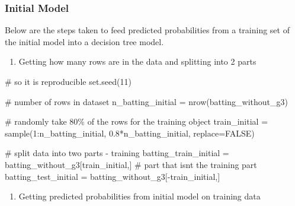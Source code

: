 \documentclass[
  letterpaper,
  DIV=11,
  numbers=noendperiod]{scrartcl}
\newenvironment{Shaded}{\begin{snugshade}}{\end{snugshade}}
\newcommand{\AttributeTok}[1]{\textcolor[rgb]{0.40,0.45,0.13}{#1}}
\newcommand{\CommentTok}[1]{\textcolor[rgb]{0.37,0.37,0.37}{#1}}
\newcommand{\ConstantTok}[1]{\textcolor[rgb]{0.56,0.35,0.01}{#1}}
\newcommand{\DecValTok}[1]{\textcolor[rgb]{0.68,0.00,0.00}{#1}}
\newcommand{\FloatTok}[1]{\textcolor[rgb]{0.68,0.00,0.00}{#1}}
\newcommand{\FunctionTok}[1]{\textcolor[rgb]{0.28,0.35,0.67}{#1}}
\newcommand{\NormalTok}[1]{\textcolor[rgb]{0.00,0.23,0.31}{#1}}
\newcommand{\OtherTok}[1]{\textcolor[rgb]{0.00,0.23,0.31}{#1}}
\newcommand{\SpecialCharTok}[1]{\textcolor[rgb]{0.37,0.37,0.37}{#1}}
\providecommand{\tightlist}{%
  \setlength{\itemsep}{0pt}\setlength{\parskip}{0pt}}\usepackage{longtable,booktabs,array}
\begin{document}
\subsubsection{Initial Model}\label{initial-model-1}

Below are the steps taken to feed predicted probabilities from a
training set of the initial model into a decision tree model.

\begin{enumerate}
\def\labelenumi{\arabic{enumi}.}
\tightlist
\item
  Getting how many rows are in the data and splitting into 2 parts
\end{enumerate}

\begin{Shaded}
\begin{Highlighting}[]
\CommentTok{\# so it is reproducible}
\FunctionTok{set.seed}\NormalTok{(}\DecValTok{11}\NormalTok{)}

\CommentTok{\# number of rows in dataset }
\NormalTok{n\_batting\_initial }\OtherTok{=} \FunctionTok{nrow}\NormalTok{(batting\_without\_g3)}

\CommentTok{\# randomly take 80\% of the rows for the training object }
\NormalTok{train\_initial }\OtherTok{=} \FunctionTok{sample}\NormalTok{(}\DecValTok{1}\SpecialCharTok{:}\NormalTok{n\_batting\_initial,}
                   \FloatTok{0.8}\SpecialCharTok{*}\NormalTok{n\_batting\_initial,}
                   \AttributeTok{replace=}\ConstantTok{FALSE}\NormalTok{)}
\end{Highlighting}
\end{Shaded}

\begin{Shaded}
\begin{Highlighting}[]
\CommentTok{\# split data into two parts {-} training }
\NormalTok{batting\_train\_initial }\OtherTok{=}\NormalTok{ batting\_without\_g3[train\_initial,]}
\CommentTok{\# part that isn\textquotesingle{}t the training part}
\NormalTok{batting\_test\_initial }\OtherTok{=}\NormalTok{ batting\_without\_g3[}\SpecialCharTok{{-}}\NormalTok{train\_initial,]}
\end{Highlighting}
\end{Shaded}

\begin{enumerate}
\def\labelenumi{\arabic{enumi}.}
\setcounter{enumi}{1}
\tightlist
\item
  Getting predicted probabilities from initial model on training data
\end{enumerate}
\end{document}
